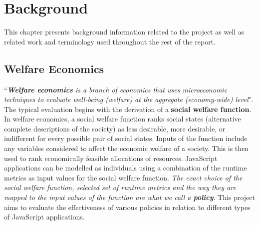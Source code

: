 \documentclass{l4proj}
\begin{document}
\chapter{Background}
\hspace*{1em} This chapter presents background information related to the project as well as related work and terminology used throughout the rest of the report.
\section{Welfare Economics}
\hspace*{1em} ``\textit{\textbf{Welfare economics} is a branch of economics that uses microeconomic techniques to evaluate well-being (welfare) at the aggregate (economy-wide) level}"\cite{welfareeconomics}. The typical evaluation begins with the derivation of a \textbf{social welfare function}. In welfare economics, a social welfare function ranks social states (alternative complete descriptions of the society) as less desirable, more desirable, or indifferent for every possible pair of social states. Inputs of the function include any variables considered to affect the economic welfare of a society\cite{socialwelfarefunction}. This is then used to rank economically feasible allocations of resources. JavaScript applications can be modelled as individuals using a combination of the runtime metrics as input values for the social welfare function. \textit{The exact choice of the social welfare function, selected set of runtime metrics and the way they are mapped to the input values of the function are what we call a \textbf{policy}}. This project aims to evaluate the effectiveness of various policies in relation to different types of JavaScript applications.
\end{document}
